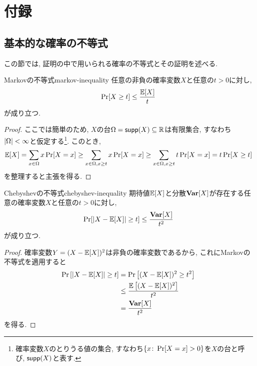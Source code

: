 \chapter{付録}

\section{基本的な確率の不等式}
この節では, 証明の中で用いられる確率の不等式とその証明を述べる.
\begin{lemma}{Markovの不等式}{markov-inequality}
  任意の非負の確率変数$X$と任意の$t>0$に対し,
  \begin{align*}
    \Pr[X\ge t] \le \frac{\operatorname*{\mathbb{E}}[X]}{t}
  \end{align*}
  が成り立つ.
\end{lemma}

\begin{proof}
  ここでは簡単のため, $X$の台$\Omega=\mathsf{supp}(X)\subseteq\mathbb{R}$は有限集合, すなわち$\abs{\Omega}<\infty$と仮定する\footnote{確率変数$X$のとりうる値の集合, すなわち$\qty{x\colon \Pr[X=x]>0}$を$X$の台と呼び, $\mathsf{supp}(X)$と表す.}.
  このとき,
  \begin{align*}
    \operatorname*{\mathbb{E}}[X] = \sum_{x\in \Omega} x\Pr[X=x] \ge \sum_{x\in \Omega,x\ge t} x\Pr[X=x] \ge \sum_{x\in \Omega,x\ge t} t\Pr[X=x] = t\Pr[X\ge t]
  \end{align*}
  を整理すると主張を得る.
\end{proof}

\begin{lemma}{Chebyshevの不等式}{chebyshev-inequality}
  期待値$\operatorname*{\mathbb{E}}[X]$と分散$\operatorname*{\mathbf{Var}}[X]$が存在する任意の確率変数$X$と任意の$t>0$に対し,
  \begin{align*}
    \Pr[|X-\operatorname*{\mathbb{E}}[X]|\ge t] \le \frac{\operatorname*{\mathbf{Var}}[X]}{t^2}
  \end{align*}
  が成り立つ.
\end{lemma}
\begin{proof}
  確率変数$Y=(X-\operatorname*{\mathbb{E}}[X])^2$は非負の確率変数であるから, これにMarkovの不等式を適用すると
  \begin{align*}
    \Pr\qty[ \abs{X - \operatorname*{\mathbb{E}}[X]} \ge t  ] &= \Pr\qty[ (X-\operatorname*{\mathbb{E}}[X])^2 \ge t^2 ] \\
    &\le \frac{\operatorname*{\mathbb{E}}\qty[ (X-\operatorname*{\mathbb{E}}[X])^2 ]}{t^2} \\
    & = \frac{\operatorname*{\mathbf{Var}}[X]}{t^2}
  \end{align*}
  を得る.
\end{proof}

